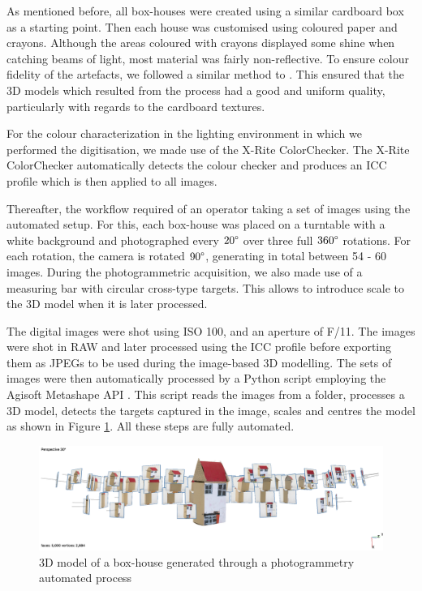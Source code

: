 \documentclass[acmlarge,screen,dvipsnames]{acmart}
\begin{document}
As mentioned before, all box-houses were created using a similar cardboard box as a starting
point. Then each house was customised using coloured paper and crayons.
Although the areas coloured with crayons displayed some shine when catching
beams of light, most material was fairly non-reflective. To ensure colour fidelity of the
artefacts, we followed a similar method to \cite{Gaiani_2017}. This ensured that the 3D models which resulted from the process had a good and uniform quality, particularly with regards to the cardboard
textures.


For the colour characterization in the lighting environment in which we performed the
digitisation, we made use of the X-Rite ColorChecker. The X-Rite ColorChecker automatically detects the
colour checker and produces an ICC profile which is then applied to all
images.


Thereafter, the workflow required of an operator taking a set of images
using the automated setup. For this, each box-house was placed on a
turntable with a white background and photographed every $20\degree$
over three full $360\degree$ rotations. For each rotation, the camera is
rotated $90\degree$, generating in total between 54 - 60 images. During the photogrammetric acquisition, we also made use of a measuring bar with circular cross-type targets. This
allows to introduce scale to the 3D model when it is later processed.

The digital images were shot using ISO 100, and an aperture of F/11. The
images were shot in RAW and later processed using the ICC profile before
exporting them as JPEGs to be used during the image-based 3D modelling. The sets of images were then automatically processed by a Python
script employing the Agisoft Metashape API \cite{Metashapesite}. This
script reads the images from a folder, processes a 3D model, detects the
targets captured in the image, scales and centres the model as shown in
Figure \ref{fig:metashape}. All these steps are fully automated.


\begin{figure}[ht] \centering
\includegraphics[width=1\linewidth]{images/metashape.png} 
\caption{3D model of a box-house generated through a photogrammetry automated
process} \label{fig:metashape}  
\end{figure}
\end{document}
